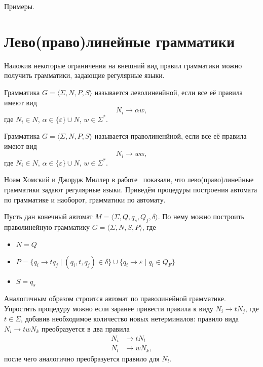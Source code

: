 \begin{example}
    Примеры.
\end{example}


\section{Лево(право)линейные грамматики}

Наложив некоторые ограничения на внешний вид правил грамматики можно получить грамматики, задающие регулярные языки.

\begin{definition}
    Грамматика $G=\langle \Sigma, N, P, S \rangle$ называется леволиненйной, если все её правила имеют вид
    \[N_i \to \alpha w,\]
    где $N_i \in N$, $\alpha \in \{\varepsilon\} \cup N$, $w \in \Sigma ^*$.
\end{definition}

\begin{definition}
    Грамматика $G=\langle \Sigma, N, P, S \rangle$ называется праволиненйной, если все её правила имеют вид
    \[N_i \to  w \alpha,\]
    где $N_i \in N$, $\alpha \in \{\varepsilon\} \cup N$, $w \in \Sigma ^*$.
\end{definition}

Ноам Хомский и Джордж Миллер в работе~ показали, что лево(право)линейные грамматики задают регулярные языки.
Приведём процедуры построения автомата по грамматике и наоборот, грамматики по автомату.

Пусть дан конечный автомат $M = \langle \Sigma, Q, q_s, Q_f, \delta \rangle$. По нему можно построить праволинейную грамматику $G=\langle \Sigma, N, S, P \rangle$, где
\begin{itemize}
    \item $N = Q$
    \item $P = \{ q_i \to t q_j \mid (q_i, t, q_j)\in \delta\} \cup \{ q_i \to \varepsilon \mid q_i \in Q_F\}$
    \item $S = q_s$
\end{itemize}

Аналогичным образом строится автомат по праволинейной грамматике.
Упростить процедуру можно если заранее привести правила к виду $N_i \to tN_j$, где $t\in \Sigma$, добавив необходимое количество новых нетерминалов:
правило вида $N_i \to twN_k$ преобразуется в два правила
\begin{align*}
    N_i & \to tN_l  \\
    N_l & \to wN_k,
\end{align*}
после чего аналогично преобразуется правило для $N_l$.

